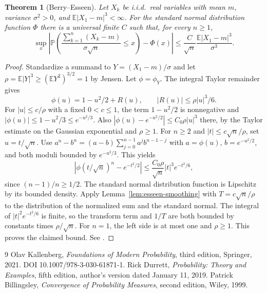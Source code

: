 \documentclass[11pt,oneside,openany]{book}
\newcommand{\Prob}{\mathbb{P}}
\newcommand{\E}{\mathbb{E}}
\theoremstyle{plain}
\newtheorem{theorem}{Theorem}[chapter]
\theoremstyle{definition}
\theoremstyle{remark}
\begin{document}
\begin{theorem}[Berry--Esseen]\label{thm:berry-esseen}
Let \(X_k\) be i.i.d.\ real variables with mean \(m\), variance
\(\sigma^2>0\), and \(\E|X_1-m|^3<\infty\).
For the standard normal distribution function \(\Phi\) there is a
universal finite \(C\) such that, for every \(n\ge1\),
\[
 \sup_x\left|
   \Prob\left(\frac{\sum_{k=1}^n(X_k-m)}{\sigma\sqrt n}\le x\right)
        -\Phi(x)\right|
 \le \frac{C}{\sqrt n}\frac{\E|X_1-m|^3}{\sigma^3}.
\]
\end{theorem}

\begin{proof}
Standardize a summand to \(Y=(X_1-m)/\sigma\) and let
\(\rho=\E|Y|^3\ge(\E Y^2)^{3/2}=1\) by Jensen.
Let \(\phi=\phi_Y\). The integral Taylor remainder gives
\[
 \phi(u)=1-u^2/2+R(u),\qquad |R(u)|\le\rho |u|^3/6 .
\]
For \(|u|\le c/\rho\) with a fixed \(0<c\le1\), the term
\(1-u^2/2\) is nonnegative and
\(|\phi(u)|\le 1-u^2/3\le e^{-u^2/3}\).
Also
\(|\phi(u)-e^{-u^2/2}|\le C_0\rho|u|^3\) there, by the
Taylor estimate on the Gaussian exponential and \(\rho\ge1\).
For \(n\ge2\) and \(|t|\le c\sqrt n/\rho\), set \(u=t/\sqrt n\).
Use \(a^n-b^n=(a-b)\sum_{j=0}^{n-1}a^j b^{n-1-j}\)
with \(a=\phi(u)\), \(b=e^{-u^2/2}\), and both moduli bounded by
\(e^{-u^2/3}\). This yields
\[
 |\phi(t/\sqrt n)^n-e^{-t^2/2}|
 \le \frac{C_0\rho}{\sqrt n}|t|^3 e^{-t^2/6},
\]
since \((n-1)/n\ge1/2\).
The standard normal distribution function is Lipschitz by its bounded
density. Apply Lemma~\ref{lem:esseen-smoothing} with
\(T=c\sqrt n/\rho\) to the distribution of the normalized sum and the
standard normal. The integral of \(|t|^2 e^{-t^2/6}\) is finite,
so the transform term and \(1/T\) are both bounded by constants
times \(\rho/\sqrt n\). For \(n=1\), the left side is at most one
and \(\rho\ge1\). This proves the claimed bound.
See \cite[Theorem 3.4.17, pp.\ 157--160]{Durrett}.
\end{proof}

\backmatter
\begin{thebibliography}{9}
Olav Kallenberg, \emph{Foundations of Modern Probability}, third edition,
Springer, 2021. DOI 10.1007/978-3-030-61871-1.
Rick Durrett, \emph{Probability: Theory and Examples}, fifth edition,
author's version dated January 11, 2019.
Patrick Billingsley, \emph{Convergence of Probability Measures},
second edition, Wiley, 1999.
\end{thebibliography}
\end{document}
